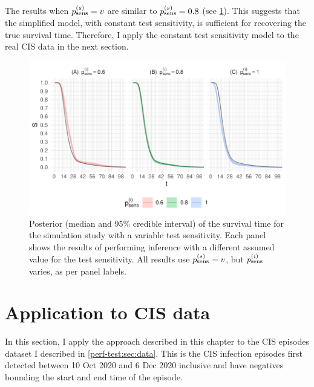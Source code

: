 \documentclass[thesis.tex]{subfiles}
\begin{document}
The results when $p_\text{sens}^{(s)} = v$ are similar to $p_\text{sens}^{(s)} = 0.8$ (see \cref{imperf-test:fig:variable-test-sensitivity}).
This suggests that the simplified model, with constant test sensitivity, is sufficient for recovering the true survival time.
Therefore, I apply the constant test sensitivity model to the real CIS data in the next section.
\begin{figure}
    \includegraphics[width=\textwidth]{cis-imperfect-testing/sim-variable-sensitivity}
  \caption[Simulation study results with varying test sensitivity]{%
    Posterior (median and 95\% credible interval) of the survival time for the simulation study with a variable test sensitivity.
    Each panel shows the results of performing inference with a different assumed value for the test sensitivity.
    All results use $p_\text{sens}^{(s)} = v$, but $p_\text{sens}^{(i)}$ varies, as per panel labels.
  }
  \label{imperf-test:fig:variable-test-sensitivity}
\end{figure}

\section{Application to CIS data} \label{imperf-test:sec:application}

In this section, I apply the approach described in this chapter to the CIS episodes dataset I described in \cref{perf-test:sec:data}.
This is the  CIS infection episodes first detected between 10 Oct 2020 and 6 Dec 2020 inclusive and have negatives bounding the start and end time of the episode.
\end{document}

